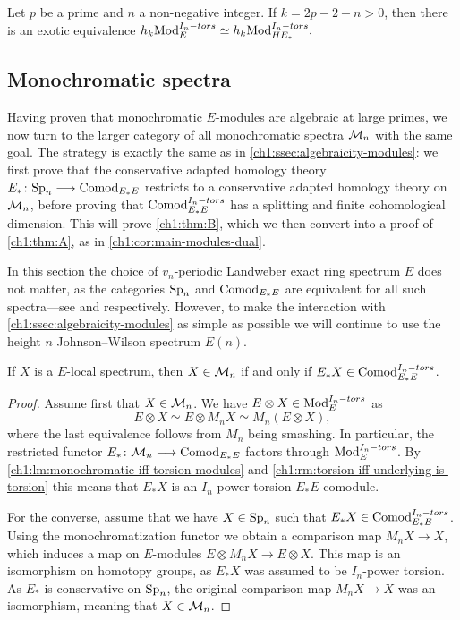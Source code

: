 \begin{corollary}
    Let $p$ be a prime and $n$ a non-negative integer. If $k=2p-2-n>0$, then there is an exotic equivalence $h_k \mathrm{Mod}_{E}^{I_n-tors} \simeq h_k \mathrm{Mod}_{HE_*}^{I_n-tors}.$
\end{corollary}



\subsection{Monochromatic spectra}
\label{ch1:ssec:algebraicity-spectra}

Having proven that monochromatic $E$-modules are algebraic at large primes, we now turn to the larger category of all monochromatic spectra $\mathcal{M}_{n}$ with the same goal. The strategy is exactly the same as in \cref{ch1:ssec:algebraicity-modules}: we first prove that the conservative adapted homology theory $E_*\colon \mathrm{Sp}_{n}\longrightarrow \mathrm{Comod}_{E_*E}$ restricts to a conservative adapted homology theory on $\mathcal{M}_{n}$, before proving that $\mathrm{Comod}_{E_*E}^{I_n-tors}$ has a splitting and finite cohomological dimension. This will prove \cref{ch1:thm:B}, which we then convert into a proof of \cref{ch1:thm:A}, as in \cref{ch1:cor:main-modules-dual}. 

In this section the choice of $v_n$-periodic Landweber exact ring spectrum $E$ does not matter, as the categories $\mathrm{Sp}_{n}$ and $\mathrm{Comod}_{E_*E}$ are equivalent for all such spectra---see \cite[1.12]{hovey_95} and \cite[4.2]{hovey-strickland_2005a} respectively. However, to make the interaction with \cref{ch1:ssec:algebraicity-modules} as simple as possible we will continue to use the height $n$ Johnson--Wilson spectrum $E(n)$.

\begin{lemma}
    \label{ch1:lm:monochromatic-iff-torsion-comodules}
    If $X$ is a $E$-local spectrum, then $X\in \mathcal{M}_{n}$ if and only if $E_*X\in \mathrm{Comod}_{E_*E}^{I_n-tors}$. 
\end{lemma}
\begin{proof}
    Assume first that $X\in \mathcal{M}_{n}$. We have $E\otimes X\in \mathrm{Mod}_{E}^{I_n-tors}$ as
    $$E\otimes X\simeq E\otimes M_n X\simeq M_n (E\otimes X),$$
    where the last equivalence follows from $M_n$ being smashing. In particular, the restricted functor $E_*\colon \mathcal{M}_{n}\longrightarrow \mathrm{Comod}_{E_*E}$ factors through $\mathrm{Mod}_{E}^{I_n-tors}$. By \cref{ch1:lm:monochromatic-iff-torsion-modules} and \cref{ch1:rm:torsion-iff-underlying-is-torsion} this means that $E_*X$ is an $I_n$-power torsion $E_*E$-comodule. 

    For the converse, assume that we have $X\in \mathrm{Sp}_{n}$ such that $E_*X\in \mathrm{Comod}_{E_*E}^{I_n-tors}$. Using the monochromatization functor we obtain a comparison map $M_n X\longrightarrow X$, which induces a map on $E$-modules $E\otimes M_n X\longrightarrow E\otimes X$. This map is an isomorphism on homotopy groups, as $E_*X$ was assumed to be $I_n$-power torsion. As $E_*$ is conservative on $\mathrm{Sp}_{n}$, the original comparison map $M_n X\longrightarrow X$ was an isomorphism, meaning that $X\in \mathcal{M}_{n}$. 
\end{proof}

